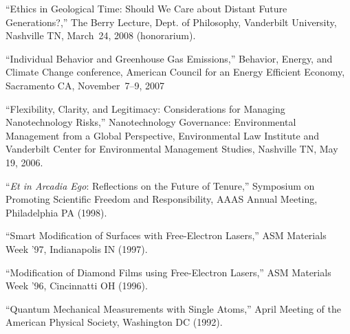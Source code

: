 \item ``Ethics in Geological Time: Should We Care about Distant Future Generations?,'' The Berry Lecture, Dept. of Philosophy, Vanderbilt University, Nashville TN, March~24, 2008 (honorarium).
\item ``Individual Behavior and Greenhouse Gas Emissions,'' Behavior, Energy, and Climate Change conference, American Council for an Energy Efficient Economy, Sacramento CA, November~7--9, 2007
\item ``Flexibility, Clarity, and Legitimacy: Considerations for Managing Nanotechnology Risks,'' Nanotechnology Governance: Environmental Management from a Global Perspective, Environmental Law Institute and Vanderbilt Center for Environmental Management Studies, Nashville TN, May 19, 2006.
\item ``\emph{Et in Arcadia Ego}: Reflections on the Future of Tenure,'' Symposium on Promoting Scientific Freedom and Responsibility, AAAS Annual Meeting, Philadelphia PA (1998).
\item ``Smart Modification of Surfaces with Free-Electron Lasers,'' ASM Materials Week '97, Indianapolis IN (1997).
\item ``Modification of Diamond Films using Free-Electron Lasers,'' ASM Materials Week '96, Cincinnatti OH (1996).
\item ``Quantum Mechanical Measurements with Single Atoms,'' April Meeting of the American Physical Society, Washington DC (1992).
